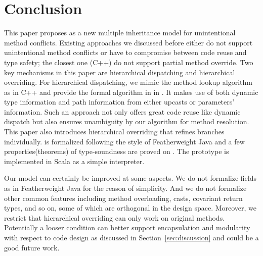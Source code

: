\section{Conclusion}

This paper proposes \MIM{} as a new multiple inheritance model for unintentional method conflicts. 
Existing approaches we discussed before either do not support unintentional method conflicts or have to compromise between code reuse and type safety; the closest one (C++) do not support partial method override. Two key mechanisms in this paper are hierarchical dispatching and hierarchical overriding. For hierarchical dispatching, we mimic the method lookup algorithm as in C++ and provide the formal algorithm in \mbody{} in \MIM{}. It makes use of both dynamic type information and path information from either upcasts or parameters' information. 
Such an approach not only offers great code reuse like dynamic dispatch but also ensures unambiguity by our algorithm for method resolution. This paper also introduces hierarchical overriding that refines branches individually.
\MIM{} is formalized following the style of Featherweight Java and a few properties(theorems) of type-soundness are proved on \MIM{}. The prototype is implemented in Scala as a simple interpreter.

Our model can certainly be improved at some aspects. We do not formalize fields as in Featherweight Java for the reason of simplicity. And we do not formalize other common features including method overloading, casts, covariant return types, and so on, some of which are orthogonal in the design space. Moreover, we restrict that hierarchical overriding can only work on original methods. Potentially a looser condition can better support encapsulation and modularity with respect to code design as discussed in Section~\ref{sec:discussion} and could be a good future work.